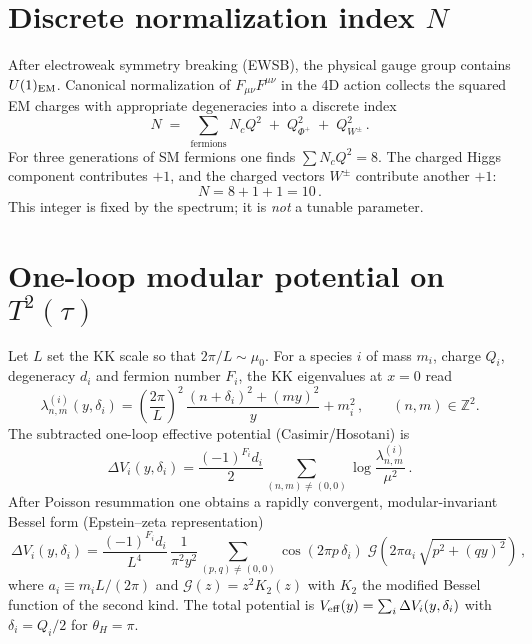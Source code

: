 \documentclass[11pt,a4paper]{article}
\begin{document}
\section{Discrete normalization index \(N\)}
After electroweak symmetry breaking (EWSB), the physical gauge group contains \(U(1)_{\rm EM}\). Canonical normalization of \(F_{\mu\nu}F^{\mu\nu}\) in the 4D action collects the squared EM charges with appropriate degeneracies into a discrete index
\begin{equation}
N\;=\;\sum_{\text{fermions}} N_c Q^2\; +\; Q^2_{\Phi^+}\; +\; Q^2_{W^{\pm}}\,.
\end{equation}
For three generations of SM fermions one finds \(\sum N_c Q^2 = 8\). The charged Higgs component contributes \(+1\), and the charged vectors \(W^{\pm}\) contribute another \(+1\):
\begin{equation}
\boxed{\quad N=8+1+1 = 10\,.\quad}
\end{equation}
This integer is fixed by the spectrum; it is \emph{not} a tunable parameter.

\section{One-loop modular potential on \(T^2(\tau)\)}
Let \(L\) set the KK scale so that \(2\pi/L\sim\mu_0\). For a species \(i\) of mass \(m_i\), charge \(Q_i\), degeneracy \(d_i\) and fermion number \(F_i\), the KK eigenvalues at \(x=0\) read
\begin{equation}
\lambda^{(i)}_{n,m}(y,\delta_i) = \left(\frac{2\pi}{L}\right)^2\,\frac{(n+\delta_i)^2+(m y)^2}{y} + m_i^2\,,\qquad (n,m)\in\mathbb{Z}^2.
\end{equation}
The subtracted one-loop effective potential (Casimir/Hosotani) is
\begin{equation}
\Delta V_i(y,\delta_i)=\frac{(-1)^{F_i} d_i}{2}\sum_{(n,m)\neq(0,0)}\log\!\frac{\lambda^{(i)}_{n,m}}{\mu^2}\,.
\end{equation}
After Poisson resummation one obtains a rapidly convergent, modular-invariant Bessel form (Epstein–zeta representation)
\begin{equation}
\boxed{\ \Delta V_i(y,\delta_i)=\frac{(-1)^{F_i} d_i}{L^4}\,\frac{1}{\pi^2 y^2}\sum_{(p,q)\neq(0,0)} \cos(2\pi p\,\delta_i)\; \mathcal{G}\!\left(2\pi a_i\,\sqrt{p^2+(q y)^2}\right)\,,\ }
\end{equation}
where \(a_i\equiv m_i L/(2\pi)\) and \(\mathcal{G}(z)=z^2 K_2(z)\) with \(K_2\) the modified Bessel function of the second kind. The total potential is \(V_{\rm eff}(y)=\sum_i \Delta V_i(y,\delta_i)\) with \(\delta_i=Q_i/2\) for \(\theta_H=\pi\).
\end{document}

